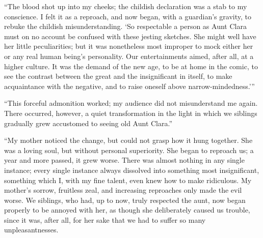 \documentclass[12pt,a4paper]{book}
\begin{document}
``The blood shot up into my cheeks; the childish declaration was a stab to my conscience. I felt it as a reproach, and now began, with a guardian's gravity, to rebuke the childish misunderstanding. `So respectable a person as Aunt Clara must on no account be confused with these jesting sketches. She might well have her little peculiarities; but it was nonetheless most improper to mock either her or any real human being's personality. Our entertainments aimed, after all, at a higher culture. It was the demand of the new age, to be at home in the comic, to see the contrast between the great and the insignificant in itself, to make acquaintance with the negative, and to raise oneself above narrow-mindedness.'''

``This forceful admonition worked; my audience did not misunderstand me again. There occurred, however, a quiet transformation in the light in which we siblings gradually grew accustomed to seeing old Aunt Clara.''

``My mother noticed the change, but could not grasp how it hung together. She was a loving soul, but without personal superiority. She began to reproach us; a year and more passed, it grew worse. There was almost nothing in any single instance; every single instance always dissolved into something most insignificant, something which I, with my fine talent, even knew how to make ridiculous. My mother's sorrow, fruitless zeal, and increasing reproaches only made the evil worse.
We siblings, who had, up to now, truly respected the aunt, now began properly to be annoyed with her, as though she deliberately caused us trouble, since it was, after all, for her sake that we had to suffer so many unpleasantnesses.
\end{document}
